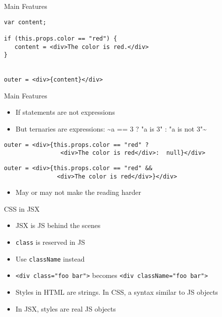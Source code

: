 \documentclass[presentation]{beamer}
\begin{document}
\begin{frame}[fragile,label={sec:orgheadline8}]{Main Features}
 \begin{verbatim}
var content;

if (this.props.color == "red") {
   content = <div>The color is red.</div>
}


outer = <div>{content}</div>
\end{verbatim}
\end{frame}

\begin{frame}[fragile,label={sec:orgheadline9}]{Main Features}
 \begin{itemize}
\item If statements are not expressions
\item But ternaries are expressions: \textasciitilde{}a == 3 ? "a is 3" : "a is not 3"\textasciitilde{}
\end{itemize}

\begin{verbatim}
outer = <div>{this.props.color == "red" ?
                <div>The color is red</div>:  null}</div>
\end{verbatim}

\begin{verbatim}
outer = <div>{this.props.color == "red" &&
               <div>The color is red</div>}</div>
\end{verbatim}

\begin{itemize}
\item May or may not make the reading harder
\end{itemize}
\end{frame}

\begin{frame}[fragile,label={sec:orgheadline10}]{CSS in JSX}
 \begin{itemize}
\item JSX is JS behind the scenes
\item \texttt{class} is reserved in JS
\item Use \texttt{className} instead
\item \texttt{<div class="foo bar">} becomes \texttt{<div className="foo bar">}
\item Styles in HTML are strings. In CSS, a syntax similar to
JS objects
\item In JSX, styles are real JS objects
\end{itemize}
\end{frame}
\end{document}
